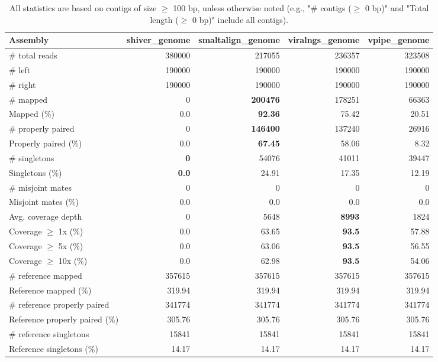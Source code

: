 \documentclass[12pt,a4paper]{article}
\begin{document}
\begin{table}[ht]
\begin{center}
\caption{All statistics are based on contigs of size $\geq$ 100 bp, unless otherwise noted (e.g., "\# contigs ($\geq$ 0 bp)" and "Total length ($\geq$ 0 bp)" include all contigs).}
\begin{tabular}{|l*{4}{|r}|}
\hline
Assembly & shiver\_genome & smaltalign\_genome & viralngs\_genome & vpipe\_genome \\ \hline
\# total reads & 380000 & 217055 & 236357 & 323508 \\ \hline
\# left & 190000 & 190000 & 190000 & 190000 \\ \hline
\# right & 190000 & 190000 & 190000 & 190000 \\ \hline
\# mapped & 0 & {\bf 200476} & 178251 & 66363 \\ \hline
Mapped (\%) & 0.0 & {\bf 92.36} & 75.42 & 20.51 \\ \hline
\# properly paired & 0 & {\bf 146400} & 137240 & 26916 \\ \hline
Properly paired (\%) & 0.0 & {\bf 67.45} & 58.06 & 8.32 \\ \hline
\# singletons & {\bf 0} & 54076 & 41011 & 39447 \\ \hline
Singletons (\%) & {\bf 0.0} & 24.91 & 17.35 & 12.19 \\ \hline
\# misjoint mates & 0 & 0 & 0 & 0 \\ \hline
Misjoint mates (\%) & 0.0 & 0.0 & 0.0 & 0.0 \\ \hline
Avg. coverage depth & 0 & 5648 & {\bf 8993} & 1824 \\ \hline
Coverage $\geq$ 1x (\%) & 0.0 & 63.65 & {\bf 93.5} & 57.88 \\ \hline
Coverage $\geq$ 5x (\%) & 0.0 & 63.06 & {\bf 93.5} & 56.55 \\ \hline
Coverage $\geq$ 10x (\%) & 0.0 & 62.98 & {\bf 93.5} & 54.06 \\ \hline
\# reference mapped & 357615 & 357615 & 357615 & 357615 \\ \hline
Reference mapped (\%) & 319.94 & 319.94 & 319.94 & 319.94 \\ \hline
\# reference properly paired & 341774 & 341774 & 341774 & 341774 \\ \hline
Reference properly paired (\%) & 305.76 & 305.76 & 305.76 & 305.76 \\ \hline
\# reference singletons & 15841 & 15841 & 15841 & 15841 \\ \hline
Reference singletons (\%) & 14.17 & 14.17 & 14.17 & 14.17 \\ \hline

\end{tabular}
\end{center}
\end{table}
\end{document}

